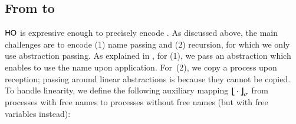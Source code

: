 \documentclass[runningheads]{llncs}
\begin{document}
{


\subsection{From \HOp to \HO}
\label{subsec:HOpi_to_HO}
$\mathsf{HO}$ is expressive enough to
precisely encode \HOp.
As discussed above, the main challenges are to encode (1) name passing 
and (2) recursion, 
for which 
we only use  abstraction passing. 
 As explained in , for (1), we pass  
an %
abstraction which enables to use the name upon application. 
For~(2), we 
copy a process upon reception; passing around linear abstractions
is  
because 
they cannot be copied.
To handle linearity, we define the following auxiliary 
 mapping 
$\big\lfloor\!\!\big\lfloor\cdot\big\rfloor\!\!\big\rfloor^{}_\sigma$
from processes with free names to processes without free
names (but with free variables instead):

}
\end{document}
